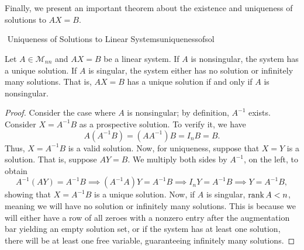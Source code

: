         \vphantom
        \\
        \\
        Finally, we present an important theorem about the existence and uniqueness of solutions to \(AX=B\).
        \begin{theorem}{\Stop\,\,Uniqueness of Solutions to Linear Systems}{uniquenessofsol}

            Let \(A\in\mathcal{M}_{nn}\) and \(AX=B\) be a linear system. If \(A\) is nonsingular, the system has a unique solution. If \(A\) is singular, the system either has no solution or infinitely many solutions. That is, \(AX=B\) has a unique solution if and only if \(A\) is nonsingular.
            \begin{proof}
                Consider the case where \(A\) is nonsingular; by definition, \(A^{-1}\) exists. Consider \(X=A^{-1}B\) as a prospective solution. To verify it, we have
                \begin{equation*}
                    A(A^{-1}B)=(AA^{-1})B=I_nB=B.
                \end{equation*}
                Thus, \(X=A^{-1}B\) is a valid solution. Now, for uniqueness, suppose that \(X=Y\) is a solution. That is, suppose \(AY=B\). We multiply both sides by \(A^{-1}\), on the left, to obtain
                \begin{equation*}
                    A^{-1}(AY)=A^{-1}B \implies (A^{-1}A)Y=A^{-1}B \implies I_nY=A^{-1}B \implies Y=A^{-1}B,
                \end{equation*}
                showing that \(X=A^{-1}B\) is a unique solution. Now, if \(A\) is singular, \(\text{rank\,} A<n\), meaning we will have no solution or infinitely many solutions. This is because we will either have a row of all zeroes with a nonzero entry after the augmentation bar yielding an empty solution set, or if the system has at least one solution, there will be at least one free variable, guaranteeing infinitely many solutions.
            \end{proof}

        \end{theorem}
